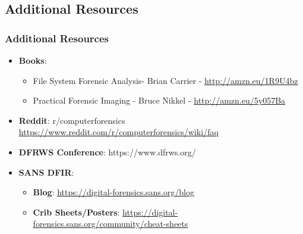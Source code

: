 \documentclass{beamer}
\begin{document}

\begin{frame}
	\section{Additional Resources}
	\frametitle{Additional Resources}
	\begin{itemize}
	\item \textbf{Books}:
		\begin{itemize}
			\item File System Forensic Analysis- Brian Carrier - \url{http://amzn.eu/1R9U4bz}
			\item Practical Forensic Imaging - Bruce Nikkel - \url{http://amzn.eu/5y057Ba}
		\end{itemize}
	\item \textbf{Reddit}: r/computerforensics \url{https://www.reddit.com/r/computerforensics/wiki/faq}
	\item \textbf{DFRWS Conference}: https://www.dfrws.org/
	\item \textbf{SANS DFIR}:
		\begin{itemize}
			\item \textbf{Blog}: \url{https://digital-forensics.sans.org/blog}
			\item \textbf{Crib Sheets/Posters}: \url{https://digital-forensics.sans.org/community/cheat-sheets}
		\end{itemize}
	\end{itemize}
\end{frame}
\end{document}
